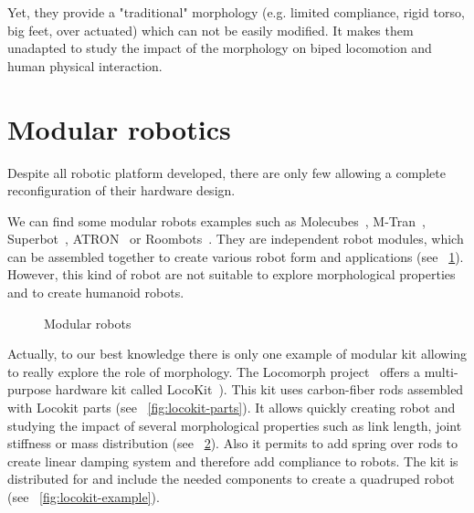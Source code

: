 Yet, they provide a "traditional" morphology (e.g. limited compliance, rigid torso, big feet, over actuated) which can not be easily modified. It makes them unadapted to study the impact of the morphology on biped locomotion and human physical interaction.



\section{Modular robotics} %

Despite all robotic platform developed, there are only few allowing a complete reconfiguration of their hardware design.

We can find some modular robots examples such as Molecubes~\parencite{zykov2007molecubes}, M-Tran~\parencite{murata2002m}, Superbot~\parencite{salemi2006superbot}, ATRON~\parencite{jorgensen2004modular} or Roombots~\parencite{sproewitz2009roombots}. They are independent robot modules, which can be assembled together to create various robot form and applications (see \figurename~\ref{fig:modular-robots}). However, this kind of robot are not suitable to explore morphological properties and to create humanoid robots.

\begin{figure}[tb]
\centering
    \hfil
    \caption{Modular robots}
    \label{fig:modular-robots}
\end{figure}

Actually, to our best knowledge there is only one example of modular kit allowing to really explore the role of morphology. The Locomorph project~\parencite{locomorph} offers a multi-purpose hardware kit called LocoKit~\parencite{larsen2012locokit}). This kit uses carbon-fiber rods assembled with Locokit parts (see \figurename~\ref{fig:locokit-parts}). It allows quickly creating robot and studying the impact of several morphological properties such as link length, joint stiffness or mass distribution (see \figurename~\ref{fig:locokit}). Also it permits to add spring over rods to create linear damping system and therefore add compliance to robots.
The kit is distributed for  and include the needed components to create a quadruped robot (see \figurename~\ref{fig:locokit-example}).

\begin{figure}[tb]
\centering
    \hfil
    \caption{}
    \label{fig:locokit}
\end{figure}

